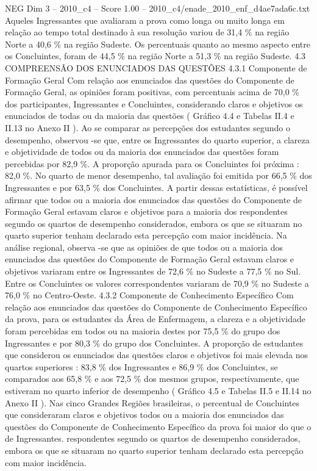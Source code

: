 \begin{textsample}{NEG Dim 3 – 2010\_c4 – Score 1.00 – 2010\_c4/enade\_2010\_enf\_d4ae7ada6c.txt}
Aqueles Ingressantes que avaliaram a prova como longa ou muito longa em relação ao tempo total destinado à sua resolução variou de 31,4 \% na região Norte a 40,6 \% na região Sudeste.
Os percentuais quanto ao mesmo aspecto entre os Concluintes, foram de 44,5 \% na região Norte a 51,3 \% na região Sudeste. 4.3 COMPREENSÃO DOS ENUNCIADOS DAS QUESTÕES 4.3.1 Componente de Formação Geral Com relação aos enunciados das questões do Componente de Formação Geral, as opiniões foram positivas, com percentuais acima de 70,0 \% dos participantes, Ingressantes e Concluintes, considerando claros e objetivos os enunciados de todas ou da maioria das questões ( Gráfico 4.4 e Tabelas II.4 e II.13 no Anexo II ).
Ao se comparar as percepções dos estudantes segundo o desempenho, observou -se que, entre os Ingressantes do quarto superior, a clareza e objetividade de todos ou da maioria dos enunciados das questões foram percebidas por 82,9 \%.
A proporção apurada para os Concluintes foi próxima : 82,0 \%.
No quarto de menor desempenho, tal avaliação foi emitida por 66,5 \% dos Ingressantes e por 63,5 \% dos Concluintes.
A partir dessas estatísticas, é possível afirmar que todos ou a maioria dos enunciados das questões do Componente de Formação Geral estavam claros e objetivos para a maioria dos respondentes segundo os quartos de desempenho considerados, embora os que se situaram no quarto superior tenham declarado esta percepção com maior incidência.
Na análise regional, observa -se que as opiniões de que todos ou a maioria dos enunciados das questões do Componente de Formação Geral estavam claros e objetivos variaram entre os Ingressantes de 72,6 \% no Sudeste a 77,5 \% no Sul.
Entre os Concluintes os valores correspondentes variaram de 70,9 \% no Sudeste a 76,0 \% no Centro-Oeste. 4.3.2 Componente de Conhecimento Específico Com relação aos enunciados das questões do Componente de Conhecimento Específico da prova, para os estudantes da Área de Enfermagem, a clareza e a objetividade foram percebidas em todos ou na maioria destes por 75,5 \% do grupo dos Ingressantes e por 80,3 \% do grupo dos Concluintes.
A proporção de estudantes que considerou os enunciados das questões claros e objetivos foi mais elevada nos quartos superiores : 83,8 \% dos Ingressantes e 86,9 \% dos Concluintes, se comparados aos 65,8 \% e aos 72,5 \% dos mesmos grupos, respectivamente, que estiveram no quarto inferior de desempenho ( Gráfico 4.5 e Tabelas II.5 e II.14 no Anexo II ).
Nas cinco Grandes Regiões brasileiras, o percentual de Concluintes que consideraram claros e objetivos todos ou a maioria dos enunciados das questões do Componente de Conhecimento Específico da prova foi maior do que o de Ingressantes. respondentes segundo os quartos de desempenho considerados, embora os que se situaram no quarto superior tenham declarado esta percepção com maior incidência.

\end{textsample}

